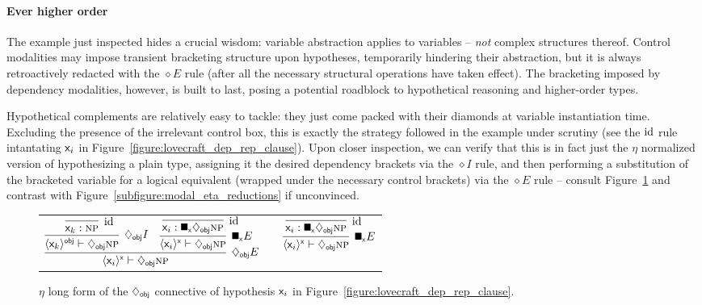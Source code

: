 \paragraph{Ever higher order}
The example just inspected hides a crucial wisdom: variable abstraction applies to variables -- \textit{not} complex structures thereof.
Control modalities may impose transient bracketing structure upon hypotheses, temporarily hindering their abstraction, but it is always retroactively redacted with the $\diamond E$ rule (after all the necessary structural operations have taken effect).
The bracketing imposed by dependency modalities, however, is built to last, posing a potential roadblock to hypothetical reasoning and higher-order types.

Hypothetical complements are relatively easy to tackle: they just come packed with their diamonds at variable instantiation time.
Excluding the presence of the irrelevant control box, this is exactly the strategy followed in the example under scrutiny (see the $\mathrm{id}$ rule intantating $\mathsf{x}_{\mathnormal{i}}$ in Figure~\ref{figure:lovecraft_dep_rep_clause}).
Upon closer inspection, we can verify that this is in fact just the $\eta$ normalized version of hypothesizing a plain type, assigning it the desired dependency brackets via the $\diamond I$ rule, and then performing a substitution of the bracketed variable for a logical equivalent (wrapped under the necessary control brackets) via the $\diamond E$ rule -- consult Figure~\ref{figure:eta_normalized_complement_hypothesis} and contrast with Figure~\ref{subfigure:modal_eta_reductions} if unconvinced.

\begin{figure}
	\begin{tabularx}{0.9\textwidth}{@{}cCc@{}}
	$
		\infer[\ddia{obj} E]{\dbra{\vari}{x} \vdash \ddia{obj}\np}{
			\infer[\ddia{obj} I]{\dbra{\vark}{obj} \vdash \ddia{obj}\np}{
				\infer[\Ax]{\vark : \np}{}
			}
			&
			\infer[\dxbox{x} E]{\dbra{\vari}{x} \vdash \ddia{obj}\np}{
				\infer[\Ax]{\vari : \dxbox{x}\ddia{obj}\np}{}
			}
		}
	$
	&
	\raisebox{10pt}{$\overset{\eta}{\equiv}$}
	&
	$
		\infer[\dxbox{x} E]{\dbra{\vari}{x} \vdash \ddia{obj} \np}{\infer[\Ax]{\vari : \dxbox{x}\ddia{obj}\np}{}}
	$
	\end{tabularx}
	\caption{$\eta$ long form of the $\ddia{obj}$ connective of hypothesis $\mathsf{x}_{\mathnormal{i}}$  in Figure~\ref{figure:lovecraft_dep_rep_clause}.}
	\label{figure:eta_normalized_complement_hypothesis}
\end{figure}

